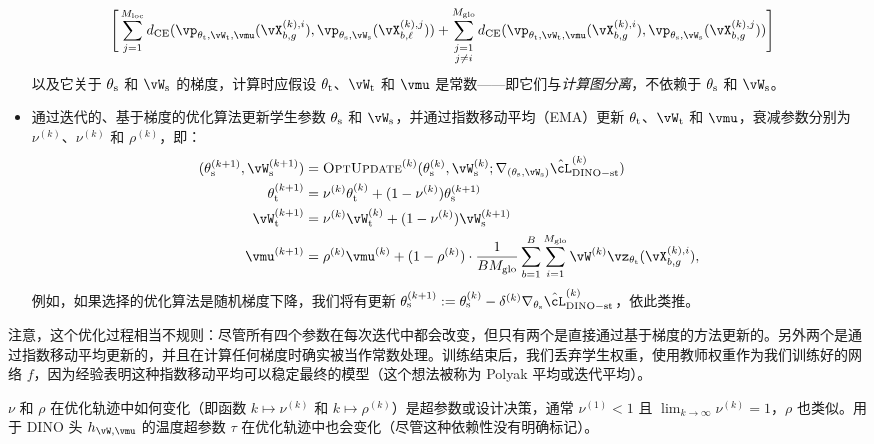 \documentclass[../../book-main.tex]{subfiles}
\begin{document}
\begin{itemize}
\begin{align}
        &\Bigg[\sum_{j = 1}^{M_{\loc}}d_{\CE}(\vp_{\theta_{\teacher}, \vW_{\teacher}, \vmu}(\vX_{b, g}^{(k), i}), \vp_{\theta_{\student}, \vW_{\student}}(\vX_{b, \ell}^{(k), j})) + \sum_{\substack{j = 1 \\ j \neq i}}^{M_{\glo}}d_{\CE}(\vp_{\theta_{\teacher}, \vW_{\teacher}, \vmu}(\vX_{b, g}^{(k), i}), \vp_{\theta_{\student}, \vW_{\student}}(\vX_{b, g}^{(k), j}))\Bigg]\nonumber
    \end{align}
    以及它关于 \(\theta_{\mathrm{s}}\) 和 \(\vW_{\student}\) 的梯度，计算时应假设 \(\theta_{\mathrm{t}}\)、\(\vW_{\teacher}\) 和 \(\vmu\) 是常数——即它们与\textit{计算图分离}，不依赖于 \(\theta_{\mathrm{s}}\) 和 \(\vW_{\student}\)。
    \item 通过迭代的、基于梯度的优化算法更新学生参数 \(\theta_{\mathrm{s}}\) 和 \(\vW_{\student}\)，并通过指数移动平均（EMA）更新 \(\theta_{\mathrm{t}}\)、\(\vW_{\teacher}\) 和 \(\vmu\)，衰减参数分别为 \(\nu^{(k)}\)、\(\nu^{(k)}\) 和 \(\rho^{(k)}\)，即：
    \begin{align}
        (\theta_{\student}^{(k + 1)}, \vW_{\student}^{(k + 1)})
        &= \textsc{OptUpdate}^{(k)}(\theta_{\student}^{(k)}, \vW_{\student}^{(k)}; \nabla_{(\theta_{\student}, \vW_{\student})}\hat{\cL}_{\dino-\student\teacher}^{(k)}) \\
        \theta_{\teacher}^{(k + 1)}
        &= \nu^{(k)}\theta_{\teacher}^{(k)} + (1 - \nu^{(k)})\theta_{\student}^{(k + 1)} \\
        \vW_{\teacher}^{(k + 1)}
        &= \nu^{(k)}\vW_{\teacher}^{(k)} + (1 - \nu^{(k)})\vW_{\student}^{(k + 1)} \\
        \vmu^{(k + 1)}
        &= \rho^{(k)}\vmu^{(k)} + (1 - \rho^{(k)})\cdot\frac{1}{BM_{\glo}}\sum_{b = 1}^{B}\sum_{i = 1}^{M_{\glo}}\vW^{(k)}\vz_{\theta_{\teacher}}(\vX_{b, g}^{(k), i}),
    \end{align}
    例如，如果选择的优化算法是随机梯度下降，我们将有更新 \(\theta_{\student}^{(k + 1)} := \theta_{\student}^{(k)} - \delta^{(k)}\nabla_{\theta_{\student}}\hat{\cL}_{\dino{}-\student\teacher}^{(k)}\)，依此类推。
\end{itemize}
注意，这个优化过程相当不规则：尽管所有四个参数在每次迭代中都会改变，但只有两个是直接通过基于梯度的方法更新的。另外两个是通过指数移动平均更新的，并且在计算任何梯度时确实被当作常数处理。训练结束后，我们丢弃学生权重，使用教师权重作为我们训练好的网络 \(f\)，因为经验表明这种指数移动平均可以稳定最终的模型（这个想法被称为 Polyak 平均或迭代平均）。

\(\nu\) 和 \(\rho\) 在优化轨迹中如何变化（即函数 \(k \mapsto \nu^{(k)}\) 和 \(k \mapsto \rho^{(k)}\)）是超参数或设计决策，通常 \(\nu^{(1)} < 1\) 且 \(\lim_{k \to \infty}\nu^{(k)} = 1\)，\(\rho\) 也类似。用于 DINO 头 \(h_{\vW, \vmu}\) 的温度超参数 \(\tau\) 在优化轨迹中也会变化（尽管这种依赖性没有明确标记）。
\end{document}
